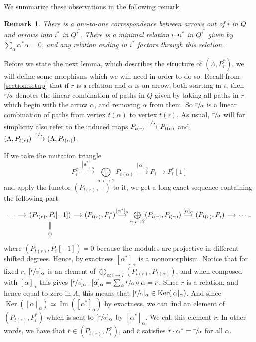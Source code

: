 \documentclass[12pt, dvipsnames, oneside]{amsart}
\DeclareMathOperator{\Ker}{Ker}
\DeclareMathOperator{\Img}{Im}
\newtheorem{remark}[theorem]{Remark}
\theoremstyle{definition}
\begin{document}
We summarize these observations in the following remark.

\begin{remark}\label{remark:intoi}
There is a one-to-one correspondence between arrows out of $i$ in $Q$ and arrows into $i^*$ in $Q^{i^*}$.
There is a minimal relation $i\dashrightarrow i^*$ in $Q^{i^*}$ given by $\sum_{\alpha}\alpha^*\alpha=0$, and any relation ending in $i^*$ factors through this relation. 

\end{remark}

Before we state the next lemma, which describes the structure of $(\Lambda, P_i^*)$, we will define some morphisms which we will need in order to do so. Recall from \cref{section:setup} that if $r$ is a relation and $\alpha$ is an arrow, both starting in $i$, then $\sfrac{r}{\alpha}$ denotes the linear combination of paths in $Q$ given by taking all paths in $r$ which begin with the arrow $\alpha$, and removing $\alpha$ from them. So $\sfrac{r}{\alpha}$ is a linear combination of paths from vertex $t(\alpha)$ to vertex $t(r)$.
As usual, $\sfrac{r}{\alpha}$ will for simplicity also refer to the induced maps $P_{t(r)}\xrightarrow{\sfrac{r}{\alpha}} P_{t(\alpha)}$ and $(\Lambda, P_{t(r)})\xrightarrow{\sfrac{r}{\alpha}} (\Lambda, P_{t(\alpha)})$.

If we take the mutation triangle
\begin{equation*}
P_i^*\xrightarrow{[\alpha^*]_{\alpha}} \bigoplus\limits_{\alpha: i\rightarrow ?} P_{t(\alpha)} \xrightarrow{[\alpha]_{\alpha}} P_i \rightarrow P_i^*[1]
\end{equation*}
and apply the functor $(P_{t(r)}, - )$ to it, we get a long exact sequence containing the following part
\begin{equation*}
\begin{tikzcd}[column sep = small, row sep = tiny]
\cdots \arrow[r] & (P_{t(r)}, P_i[-1]) \arrow[r] & (P_{t(r)}, P_i^*) \arrow[r, "{[\alpha^*]_{\alpha}}"]  & \bigoplus\limits_{\alpha:i\rightarrow ?}(P_{t(r)}, P_{t(\alpha)})  \arrow[r, "{[\alpha]_{\alpha}}"] & (P_{t(r)}, P_i) \arrow[r] & \cdots, \\
 & 0 \arrow[u, equals] & & &
\end{tikzcd}
\end{equation*}
where $(P_{t(r)}, P_i[-1]) = 0$ because the modules are projective in different shifted degrees. Hence, by exactness $[\alpha^*]_\alpha$ is a monomorphism. 
Notice that for fixed $r$, $[\sfrac{r}{\alpha}]_{\alpha}$ is an element of $\bigoplus\limits_{\alpha:i\rightarrow ?}(P_{t(r)}, P_{t(\alpha)})$, and when composed with $[\alpha]_\alpha$ this gives $[\sfrac{r}{\alpha}]_\alpha\cdot[\alpha]_\alpha=\sum_\alpha \sfrac{r}{\alpha}\circ\alpha=r$. 
Since $r$ is a relation, and hence equal to zero in $\Lambda$, this means that $[\sfrac{r}{\alpha}]_\alpha\in\Ker([\alpha]_\alpha)$. And since $\Ker([\alpha]_\alpha)\simeq\Img([\alpha^*]_\alpha)$ by exactness, we can find an element of $(P_{t(r)}, P_i^*)$ which is sent to $[\sfrac{r}{\alpha}]_\alpha$ by $[\alpha^*]_\alpha$. We call this element $\overline{r}$. In other words, we have that $\overline{r}\in (P_{t(r)}, P_i^*)$, and $\overline{r}$ satisfies $\overline{r}\cdot \alpha^*=\sfrac{r}{\alpha}$ for all $\alpha$. 
\end{document}
